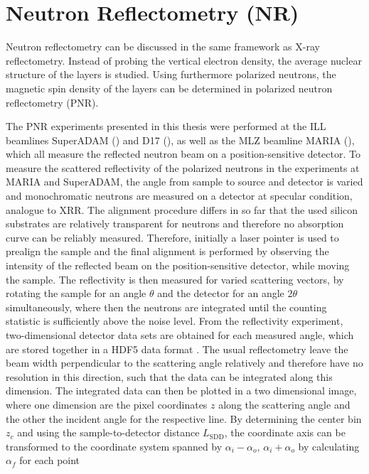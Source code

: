 \documentclass[\main/dresen_thesis.tex]{subfiles}
\begin{document}
  \section{Neutron Reflectometry (NR)}
    \label{ch:methods:nr}
    Neutron reflectometry can be discussed in the same framework as X-ray reflectometry.
    Instead of probing the vertical electron density, the average nuclear structure of the layers is studied.
    Using furthermore polarized neutrons, the magnetic spin density of the layers can be determined in polarized neutron reflectometry (PNR).

    The PNR experiments presented in this thesis were performed at the ILL beamlines SuperADAM () and D17 (), as well as the MLZ beamline MARIA (), which all measure the reflected neutron beam on a position-sensitive detector.
    To measure the scattered reflectivity of the polarized neutrons in the experiments at MARIA and SuperADAM, the angle from sample to source and detector is varied and monochromatic neutrons are measured on a detector at specular condition, analogue to XRR.
    The alignment procedure differs in so far that the used silicon substrates are relatively transparent for neutrons and therefore no absorption curve can be reliably measured.
    Therefore, initially a laser pointer is used to prealign the sample and the final alignment is performed by observing the intensity of the reflected beam on the position-sensitive detector, while moving the sample.
    The reflectivity is then measured for varied scattering vectors, by rotating the sample for an angle $\theta$ and the detector for an angle $2 \theta$ simultaneously, where then the neutrons are integrated until the counting statistic is sufficiently above the noise level.
    From the reflectivity experiment, two-dimensional detector data sets are obtained for each measured angle, which are stored together in a HDF5 data format \cite{HDF5_1997_Hiera}.
    The usual reflectometry leave the beam width perpendicular to the scattering angle relatively and therefore have no resolution in this direction, such that the data can be integrated along this dimension.
    The integrated data can then be plotted in a two dimensional image, where one dimension are the pixel coordinates $z$ along the scattering angle and the other the incident angle for the respective line.
    By determining the center bin $z_c$ and using the sample-to-detector distance $L_\mathrm{SDD}$, the coordinate axis can be transformed to the coordinate system spanned by $\alpha_i - \alpha_o,\,\alpha_i+\alpha_o$ by calculating $\alpha_f$ for each point
\end{document}
